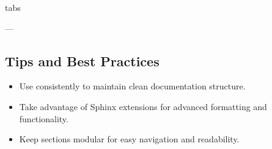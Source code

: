 \documentclass[a4paper,10pt,english]{sphinxmanual}
\begin{document}
\begin{sphinxuseclass}{tabs}\begin{tab}
\begin{sphinxVerbatim}[commandchars=\\\{\}]
 
     
\end{sphinxVerbatim}
\end{tab}\begin{tab}
\begin{sphinxVerbatim}[commandchars=\\\{\}]
\end{sphinxVerbatim}
\end{tab}
\end{sphinxuseclass}
\sphinxAtStartPar
—


\subsection{Tips and Best Practices}
\label{\detokenize{page_two:tips-and-best-practices}}\begin{itemize}
\item {} 
\sphinxAtStartPar
Use  consistently to maintain clean documentation structure.

\item {} 
\sphinxAtStartPar
Take advantage of Sphinx extensions for advanced formatting and functionality.

\item {} 
\sphinxAtStartPar
Keep sections modular for easy navigation and readability.

\end{itemize}

\sphinxstepscope
\end{document}
